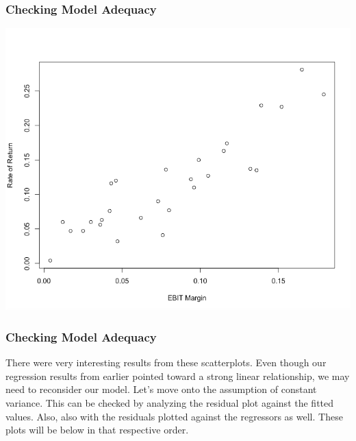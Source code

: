 \documentclass[12pt]{beamer}
\begin{document}
\begin{frame}
\frametitle{Checking Model Adequacy}
\begin{center}
\includegraphics[scale=0.3]{pic3.png}
\end{center}
\end{frame}

\begin{frame}
\frametitle{Checking Model Adequacy}
There were very interesting results from these scatterplots. Even though our regression results from earlier pointed toward a strong linear relationship, we may need to reconsider our model. Let's move onto the assumption of constant variance. This can be checked by analyzing the residual plot against the fitted values. Also, also with the residuals plotted against the regressors as well. These plots will be below in that respective order.
\end{frame}
\end{document}
